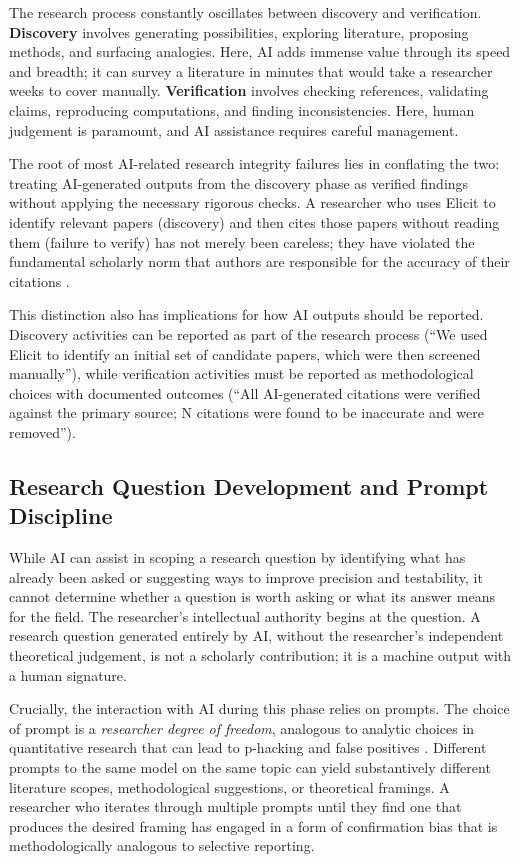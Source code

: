 \documentclass[12pt, a4paper]{article}
\begin{document}
The research process constantly oscillates between discovery and verification. \textbf{Discovery} involves generating possibilities, exploring literature, proposing methods, and surfacing analogies. Here, AI adds immense value through its speed and breadth; it can survey a literature in minutes that would take a researcher weeks to cover manually. \textbf{Verification} involves checking references, validating claims, reproducing computations, and finding inconsistencies. Here, human judgement is paramount, and AI assistance requires careful management.

The root of most AI-related research integrity failures lies in conflating the two: treating AI-generated outputs from the discovery phase as verified findings without applying the necessary rigorous checks. A researcher who uses Elicit to identify relevant papers (discovery) and then cites those papers without reading them (failure to verify) has not merely been careless; they have violated the fundamental scholarly norm that authors are responsible for the accuracy of their citations \citep{cope2023authorship}.

This distinction also has implications for how AI outputs should be reported. Discovery activities can be reported as part of the research process (``We used Elicit to identify an initial set of candidate papers, which were then screened manually''), while verification activities must be reported as methodological choices with documented outcomes (``All AI-generated citations were verified against the primary source; N citations were found to be inaccurate and were removed'').

\subsection{Research Question Development and Prompt Discipline}

While AI can assist in scoping a research question by identifying what has already been asked or suggesting ways to improve precision and testability, it cannot determine whether a question is worth asking or what its answer means for the field. The researcher's intellectual authority begins at the question. A research question generated entirely by AI, without the researcher's independent theoretical judgement, is not a scholarly contribution; it is a machine output with a human signature.

Crucially, the interaction with AI during this phase relies on prompts. The choice of prompt is a \textit{researcher degree of freedom}, analogous to analytic choices in quantitative research that can lead to p-hacking and false positives \citep{simmons2011false}. Different prompts to the same model on the same topic can yield substantively different literature scopes, methodological suggestions, or theoretical framings. A researcher who iterates through multiple prompts until they find one that produces the desired framing has engaged in a form of confirmation bias that is methodologically analogous to selective reporting.
\end{document}
